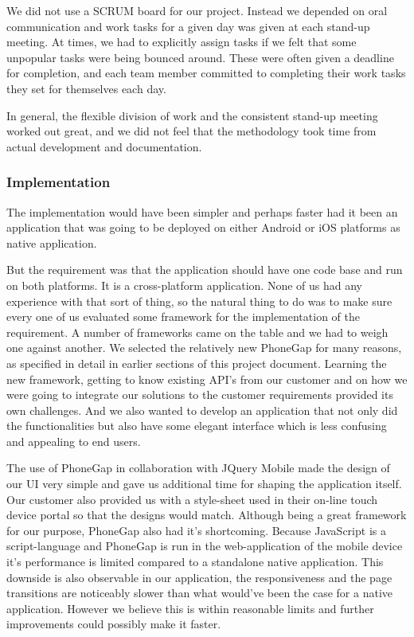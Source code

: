 We did not use a SCRUM board for our project. Instead we depended on oral
communication and work tasks for a given day was given at each stand-up meeting.
At times, we had to explicitly assign tasks if we felt that some
unpopular tasks were being bounced around. These were often given a deadline for
completion, and each team member committed to completing their work tasks they
set for themselves each day.

In general, the flexible division of work and the consistent stand-up meeting
worked out great, and we did not feel that the methodology took time from actual
development and documentation.

	\subsubsection{Implementation}
The implementation would have been simpler and perhaps faster had it been an
application that was going to be deployed on either Android or iOS platforms as
native application.

But the requirement was that the application should have one code base and run
on both platforms.
It is a cross-platform application.
None of us had any experience with that sort of thing, so the natural thing to
do was to make sure every one of us evaluated some framework for the
implementation of the requirement.
A number of frameworks came on the table and we had to weigh one against another.
We selected the relatively new PhoneGap for many reasons, as specified in detail
in earlier sections of this project document.
Learning the new framework, getting to know existing API's from our customer and
on how we were going to integrate our solutions to the customer requirements
provided its own challenges.
And we also wanted to develop an application that not only did the
functionalities but also have some elegant interface which is less confusing and
appealing to end users.

The use of PhoneGap in collaboration with JQuery Mobile made the design of our
UI very simple and gave us additional time for shaping the application itself.
Our customer also provided us with a style-sheet used in their on-line touch
device portal so that the designs would match.  Although being a great framework
for our purpose, PhoneGap also had it's shortcoming.  Because JavaScript is a
script-language and PhoneGap is run in the web-application of the mobile device it's performance
is limited compared to a standalone native application.  This downside is also
observable in our application, the responsiveness and the page transitions are noticeably
slower than what would've been the case for a native application.  However we believe
this is within reasonable limits and further improvements could possibly make it
faster.

